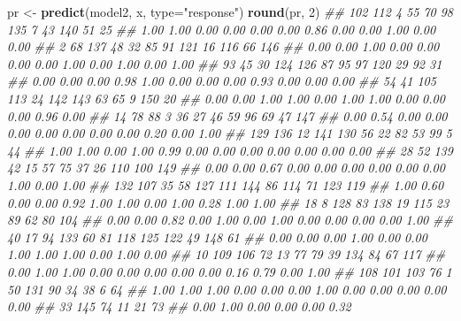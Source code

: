 \documentclass[
  notitlepage]{book}
\newenvironment{Shaded}{\begin{snugshade}}{\end{snugshade}}
\newcommand{\CommentTok}[1]{\textcolor[rgb]{0.56,0.35,0.01}{\textit{#1}}}
\newcommand{\DataTypeTok}[1]{\textcolor[rgb]{0.13,0.29,0.53}{#1}}
\newcommand{\DecValTok}[1]{\textcolor[rgb]{0.00,0.00,0.81}{#1}}
\newcommand{\KeywordTok}[1]{\textcolor[rgb]{0.13,0.29,0.53}{\textbf{#1}}}
\newcommand{\NormalTok}[1]{#1}
\newcommand{\OperatorTok}[1]{\textcolor[rgb]{0.81,0.36,0.00}{\textbf{#1}}}
\newcommand{\OtherTok}[1]{\textcolor[rgb]{0.56,0.35,0.01}{#1}}
\newcommand{\StringTok}[1]{\textcolor[rgb]{0.31,0.60,0.02}{#1}}
\begin{document}
\begin{Shaded}
\begin{Highlighting}[]
\NormalTok{pr \textless{}{-}}\StringTok{ }\KeywordTok{predict}\NormalTok{(model2, x, }\DataTypeTok{type=}\StringTok{"response"}\NormalTok{)}
\KeywordTok{round}\NormalTok{(pr, }\DecValTok{2}\NormalTok{)}
\CommentTok{\#\#  102  112    4   55   70   98  135    7   43  140   51   25 }
\CommentTok{\#\# 1.00 1.00 0.00 0.00 0.00 0.00 0.86 0.00 0.00 1.00 0.00 0.00 }
\CommentTok{\#\#    2   68  137   48   32   85   91  121   16  116   66  146 }
\CommentTok{\#\# 0.00 0.00 1.00 0.00 0.00 0.00 0.00 1.00 0.00 1.00 0.00 1.00 }
\CommentTok{\#\#   93   45   30  124  126   87   95   97  120   29   92   31 }
\CommentTok{\#\# 0.00 0.00 0.00 0.98 1.00 0.00 0.00 0.00 0.93 0.00 0.00 0.00 }
\CommentTok{\#\#   54   41  105  113   24  142  143   63   65    9  150   20 }
\CommentTok{\#\# 0.00 0.00 1.00 1.00 0.00 1.00 1.00 0.00 0.00 0.00 0.96 0.00 }
\CommentTok{\#\#   14   78   88    3   36   27   46   59   96   69   47  147 }
\CommentTok{\#\# 0.00 0.54 0.00 0.00 0.00 0.00 0.00 0.00 0.00 0.20 0.00 1.00 }
\CommentTok{\#\#  129  136   12  141  130   56   22   82   53   99    5   44 }
\CommentTok{\#\# 1.00 1.00 0.00 1.00 0.99 0.00 0.00 0.00 0.00 0.00 0.00 0.00 }
\CommentTok{\#\#   28   52  139   42   15   57   75   37   26  110  100  149 }
\CommentTok{\#\# 0.00 0.00 0.67 0.00 0.00 0.00 0.00 0.00 0.00 1.00 0.00 1.00 }
\CommentTok{\#\#  132  107   35   58  127  111  144   86  114   71  123  119 }
\CommentTok{\#\# 1.00 0.60 0.00 0.00 0.92 1.00 1.00 0.00 1.00 0.28 1.00 1.00 }
\CommentTok{\#\#   18    8  128   83  138   19  115   23   89   62   80  104 }
\CommentTok{\#\# 0.00 0.00 0.82 0.00 1.00 0.00 1.00 0.00 0.00 0.00 0.00 1.00 }
\CommentTok{\#\#   40   17   94  133   60   81  118  125  122   49  148   61 }
\CommentTok{\#\# 0.00 0.00 0.00 1.00 0.00 0.00 1.00 1.00 1.00 0.00 1.00 0.00 }
\CommentTok{\#\#   10  109  106   72   13   77   79   39  134   84   67  117 }
\CommentTok{\#\# 0.00 1.00 1.00 0.00 0.00 0.00 0.00 0.00 0.16 0.79 0.00 1.00 }
\CommentTok{\#\#  108  101  103   76    1   50  131   90   34   38    6   64 }
\CommentTok{\#\# 1.00 1.00 1.00 0.00 0.00 0.00 1.00 0.00 0.00 0.00 0.00 0.00 }
\CommentTok{\#\#   33  145   74   11   21   73 }
\CommentTok{\#\# 0.00 1.00 0.00 0.00 0.00 0.32}
\end{Highlighting}
\end{Shaded}

\begin{Shaded}
\end{Shaded}
\end{document}
